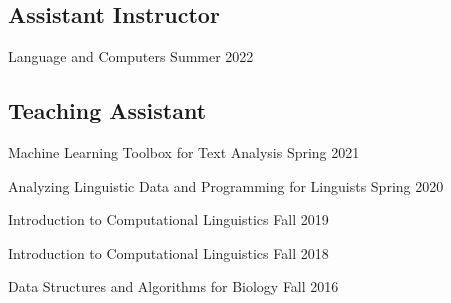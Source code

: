 \subsection{Assistant Instructor}


\quad Language and Computers \hfill Summer 2022

\subsection{Teaching Assistant}


\quad Machine Learning Toolbox for Text Analysis \hfill Spring 2021

\quad Analyzing Linguistic Data and Programming for Linguists \hfill Spring 2020

\quad Introduction to Computational Linguistics \hfill Fall 2019


\quad Introduction to Computational Linguistics \hfill Fall 2018


\quad Data Structures and Algorithms for Biology \hfill Fall 2016


